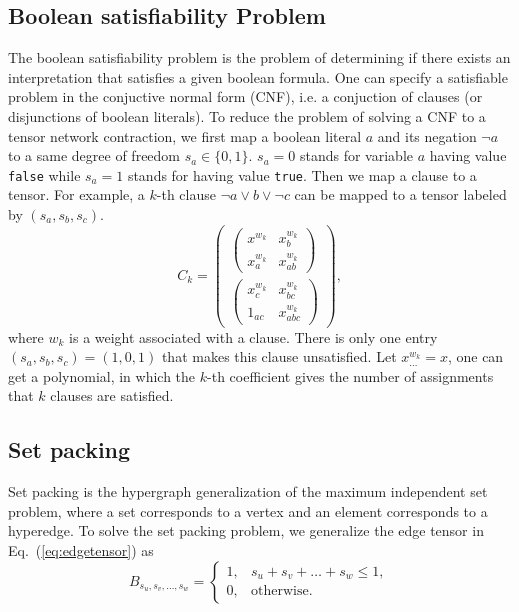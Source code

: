 \documentclass[onefignum, onetabnum]{siamart190516}
\newcommand{\<}{\langle}
\renewcommand{\>}{\rangle}
\newcommand{\Eq}[1]{Eq.~(\ref{#1})}
\newcounter{example}
\begin{document}
\subsection{Boolean satisfiability Problem}
The boolean satisfiability problem is the problem of determining if there exists an interpretation that satisfies a given boolean formula.
One can specify a satisfiable problem in the conjuctive normal form (CNF), i.e. a conjuction of clauses (or disjunctions of boolean literals).
To reduce the problem of solving a CNF to a tensor network contraction, we first map a boolean literal $a$ and its negation $\neg a$ to a same degree of freedom $s_a \in \{0, 1\}$.
$s_a = 0$ stands for variable $a$ having value \texttt{false} while $s_a=1$ stands for having value \texttt{true}.
Then we map a clause to a tensor. For example, a $k$-th clause $\neg a \vee b \vee \neg c$ can be mapped to a tensor labeled by $(s_a, s_b, s_c)$.
\begin{equation}
C_{k} = \left(\begin{matrix}
\left(\begin{matrix}
x^{w_k} & x_{b}^{w_k} \\
x_a^{w_k} & x_{ab}^{w_k}
\end{matrix}\right) \\
\left(\begin{matrix}
x_{c}^{w_k} & x_{bc}^{w_k} \\
1_{ac} & x_{abc}^{w_k}
\end{matrix}\right)
\end{matrix}\right),
\end{equation}
where $w_k$ is a weight associated with a clause. There is only one entry $(s_a, s_b, s_c) = (1, 0, 1)$ that makes this clause unsatisfied.
Let $x^{w_k}_{\ldots} = x$, one can get a polynomial, in which the $k$-th coefficient gives the number of assignments that $k$ clauses are satisfied.

\subsection{Set packing}
Set packing is the hypergraph generalization of the maximum independent set problem, where a set corresponds to a vertex and an element corresponds to a hyperedge.
To solve the set packing problem, we generalize the edge tensor in \Eq{eq:edgetensor} as
\begin{equation}
    B_{s_u,s_v,\ldots, s_w} = \begin{cases}
        1, & s_u+s_v+\ldots+s_w\leq 1,\\
        0, & \text{otherwise}.
    \end{cases}
\end{equation}
\end{document}
